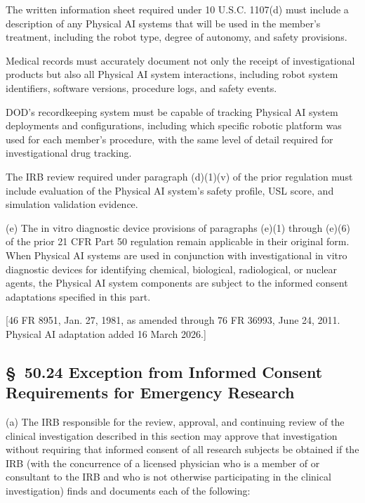\documentclass[11pt]{article}
\begin{document}
\begin{description}[leftmargin=1.0cm,style=sameline]
\item[(1)] The written information sheet required under 10 U.S.C. 1107(d) must include a description of any Physical AI systems that will be used in the member's treatment, including the robot type, degree of autonomy, and safety provisions.
\item[(2)] Medical records must accurately document not only the receipt of investigational products but also all Physical AI system interactions, including robot system identifiers, software versions, procedure logs, and safety events.
\item[(3)] DOD's recordkeeping system must be capable of tracking Physical AI system deployments and configurations, including which specific robotic platform was used for each member's procedure, with the same level of detail required for investigational drug tracking.
\item[(4)] The IRB review required under paragraph (d)(1)(v) of the prior regulation must include evaluation of the Physical AI system's safety profile, USL score, and simulation validation evidence.
\end{description}

(e) The in vitro diagnostic device provisions of paragraphs (e)(1) through (e)(6) of the prior 21 CFR Part 50 regulation remain applicable in their original form. When Physical AI systems are used in conjunction with investigational in vitro diagnostic devices for identifying chemical, biological, radiological, or nuclear agents, the Physical AI system components are subject to the informed consent adaptations specified in this part.

[46 FR 8951, Jan. 27, 1981, as amended through 76 FR 36993, June 24, 2011. Physical AI adaptation added 16 March 2026.]

\subsection{\S~50.24 Exception from Informed Consent Requirements for Emergency Research}

(a) The IRB responsible for the review, approval, and continuing review of the clinical investigation described in this section may approve that investigation without requiring that informed consent of all research subjects be obtained if the IRB (with the concurrence of a licensed physician who is a member of or consultant to the IRB and who is not otherwise participating in the clinical investigation) finds and documents each of the following:
\end{document}
